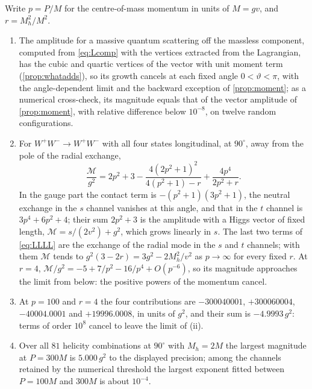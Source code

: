 \begin{theorem}
\label{thm:bounded}
Write $p=P/M$ for the centre-of-mass momentum in units of $M=gv$, and $r=M_h^2/M^2$.
\begin{enumerate}[label=(\roman*),leftmargin=2.2em,itemsep=1pt]
\item The amplitude for a massive quantum scattering off the massless component, computed from \cref{eq:Lcomp} with the vertices extracted
from the Lagrangian, has the cubic and quartic vertices of the vector with unit moment term (\cref{prop:whatadds}), so its growth cancels
at each fixed angle $0<\vartheta<\pi$, with the angle-dependent limit and the backward exception of \cref{prop:moment}; as a numerical
cross-check, its magnitude equals that of the vector amplitude of \cref{prop:moment}, with relative difference below $10^{-8}$, on twelve
random configurations.
\item For $W^+W^-\to W^+W^-$ with all four states longitudinal, at $90^\circ$, away from the pole of the radial exchange,
\begin{equation}
\label{eq:LLLL}
\frac{\mathcal M}{g^2}=2p^2+3-\frac{4(2p^2+1)^2}{4(p^2+1)-r}+\frac{4p^4}{2p^2+r} .
\end{equation}
In the gauge part the contact term is $-(p^2+1)(3p^2+1)$, the neutral exchange in the $s$ channel vanishes at this angle, and that in the
$t$ channel is $3p^4+6p^2+4$; their sum $2p^2+3$ is the amplitude with a Higgs vector of fixed length, $\mathcal M=s/(2v^2)+g^2$, which grows
linearly in $s$. The last two terms of \cref{eq:LLLL} are the exchange of the radial mode in the $s$ and $t$ channels; with them $\mathcal M$
tends to $g^2(3-2r)=3g^2-2M_h^2/v^2$ as $p\to\infty$ for every fixed $r$. At $r=4$, $\mathcal M/g^2=-5+7/p^2-16/p^4+O(p^{-6})$, so its
magnitude approaches the limit from below: the positive powers of the momentum cancel.
\item At $p=100$ and $r=4$ the four contributions are $-300040001$, $+300060004$, $-40004.0001$ and $+19996.0008$, in units of $g^2$, and
their sum is $-4.9993\,g^2$: terms of order $10^8$ cancel to leave the limit of (ii).
\item Over all $81$ helicity combinations at $90^\circ$ with $M_h=2M$ the largest magnitude at $P=300M$ is $5.000\,g^2$ to the displayed
precision; among the channels retained by the numerical threshold the largest exponent fitted between $P=100M$ and $300M$ is about
$10^{-4}$.
\end{enumerate}
\end{theorem}

